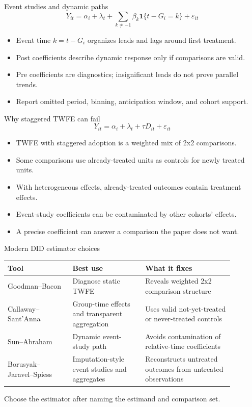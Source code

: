\documentclass[aspectratio=169,11pt]{beamer}
\newcommand{\1}{\mathbf{1}}
\begin{document}
\begin{frame}{Event studies and dynamic paths}
\[
Y_{it}
=
\alpha_i+\lambda_t+
\sum_{k\neq -1}\beta_k \1\{t-G_i=k\}
+\varepsilon_{it}
\]

\begin{itemize}
    \item Event time $k=t-G_i$ organizes leads and lags around first treatment.
    \item Post coefficients describe dynamic response only if comparisons are valid.
    \item Pre coefficients are diagnostics; insignificant leads do not prove parallel trends.
    \item Report omitted period, binning, anticipation window, and cohort support.
\end{itemize}
\end{frame}

\begin{frame}{Why staggered TWFE can fail}
\[
Y_{it}=\alpha_i+\lambda_t+\tau D_{it}+\varepsilon_{it}
\]

\begin{itemize}
    \item TWFE with staggered adoption is a weighted mix of 2x2 comparisons.
    \item Some comparisons use already-treated units as controls for newly treated units.
    \item With heterogeneous effects, already-treated outcomes contain treatment effects.
    \item Event-study coefficients can be contaminated by other cohorts' effects.
    \item A precise coefficient can answer a comparison the paper does not want.
\end{itemize}
\end{frame}

\begin{frame}{Modern DID estimator choices}
\small
\begin{tabular}{p{0.25\linewidth} p{0.29\linewidth} p{0.34\linewidth}}
\toprule
Tool & Best use & What it fixes \\
\midrule
Goodman--Bacon & Diagnose static TWFE & Reveals weighted 2x2 comparison structure \\
Callaway--Sant'Anna & Group-time effects and transparent aggregation & Uses valid not-yet-treated or never-treated controls \\
Sun--Abraham & Dynamic event-study path & Avoids contamination of relative-time coefficients \\
Borusyak--Jaravel--Spiess & Imputation-style event studies and aggregates & Reconstructs untreated outcomes from untreated observations \\
\bottomrule
\end{tabular}

\medskip
Choose the estimator after naming the estimand and comparison set.
\end{frame}
\end{document}
